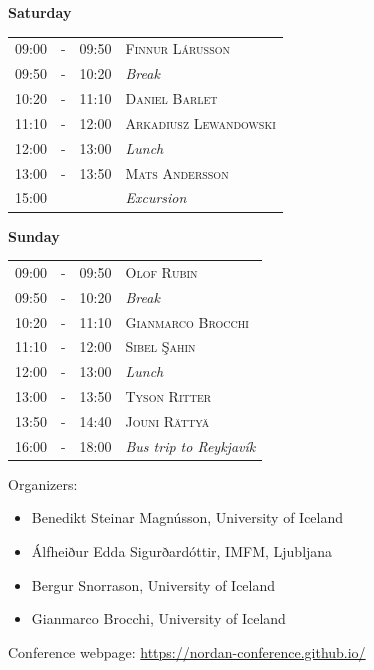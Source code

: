 \documentclass[12pt, openany]{report}      %
\begin{document}
\bigskip
\noindent
\textbf{\large Saturday}
\smallskip

\noindent
\begin{tabular}{l@{ } l@{ } l l}
09:00 & - & 09:50 & \textsc{Finnur Lárusson}
\\
09:50 & - & 10:20 & \textit{Break}
\\
10:20 & - & 11:10 & \textsc{Daniel Barlet}
\\
11:10 & - & 12:00 & \textsc{Arkadiusz Lewandowski}
\\
12:00 & - & 13:00 & \textit{Lunch}
\\
13:00 & - & 13:50 & \textsc{Mats Andersson}
\\
15:00 &  &  & \textit{Excursion}
\end{tabular}

\bigskip
\noindent
\textbf{\large Sunday}
\smallskip

\noindent
\begin{tabular}{l@{ } l@{ } l l}
09:00 & - & 09:50 & \textsc{Olof Rubin}
\\
09:50 & - & 10:20 & \textit{Break}
\\
10:20 & - & 11:10 & \textsc{Gianmarco Brocchi}
\\
11:10 & - & 12:00 & \textsc{Sibel Şahin}
\\
12:00 & - & 13:00 & \textit{Lunch}
\\
13:00 & - & 13:50 & \textsc{Tyson Ritter}
\\
13:50 & - & 14:40 & \textsc{Jouni Rättyä}
\\
16:00 & - & 18:00 & \textit{Bus trip to Reykjavík}
\end{tabular}

\vfill
\vfill
\noindent
Organizers:
\begin{itemize}
    \setlength\itemsep{-0.3 em}
    \item Benedikt Steinar Magnússon, University of Iceland
    \item Álfheiður Edda Sigurðardóttir, IMFM, Ljubljana
    \item Bergur Snorrason, University of Iceland
    \item Gianmarco Brocchi, University of Iceland
\end{itemize}

\noindent
Conference webpage: \url{https://nordan-conference.github.io/}
\vfill

\cleardoublepage

\newcommand\talk[3]{%
    \vspace{3 ex}
    \noindent
    \textsc{\large #1}

    \smallskip
    \noindent
    \textbf{\textit{#2}}

    \medskip
    \noindent
    #3

}
\end{document}
